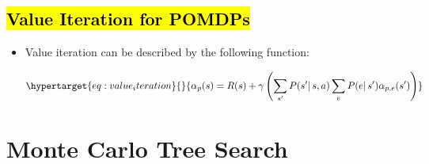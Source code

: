 \documentclass[
]{book}
\begin{document}
\hypertarget{value-iteration-for-pomdps}{%
\subsection{\texorpdfstring{\hl{Value Iteration for
POMDPs}}{Value Iteration for POMDPs}}\label{value-iteration-for-pomdps}}

\begin{itemize}
\item
  Value iteration can be described by the following function:

  \begin{equation}\protect\hypertarget{eq:value_iteration}{}{
  \alpha_{p}(s)=R(s)+\gamma\left(\sum_{s^{\prime}}P(s^{\prime}|\,s,a)\sum_{e}P(e|\,s^{\prime})\alpha_{p,e}(s^{\prime})\right)
  }\label{eq:value_iteration}\end{equation}
\end{itemize}

\hypertarget{monte-carlo-tree-search}{%
\section{Monte Carlo Tree Search}\label{monte-carlo-tree-search}}
\end{document}
